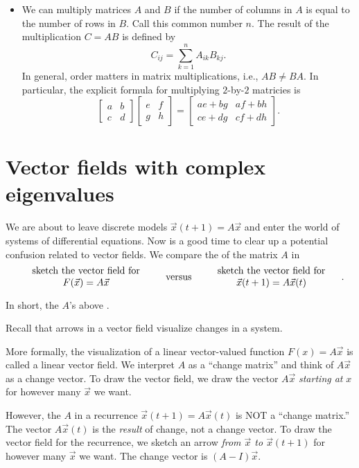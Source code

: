 \documentclass[../main.tex]{subfiles}
\begin{document}
\begin{itemize}
  \item We can multiply matrices \(A\) and \(B\) if the number of columns in \(A\) is equal to the number of rows in \(B\). Call this common number \(n\). The result of the multiplication \(C = AB\) is defined by 
\[
  C_{ij} = \sum_{k=1}^{n} A_{ik} B_{kj}.
\]
In general, order matters in matrix multiplications, i.e., \(AB \ne BA\).  In particular, the explicit formula for multiplying \(2\)-by-\(2\) matricies is
\[
  \begin{bmatrix}
    a & b \\
    c & d
  \end{bmatrix}
  \begin{bmatrix}
    e & f \\
    g & h
  \end{bmatrix}
  =
  \begin{bmatrix}
    ae + bg & af + bh \\
    ce + dg & cf + dh
  \end{bmatrix}.
\]
\end{itemize}
\clearpage

\section{Vector fields with complex eigenvalues}

We are about to leave discrete models \(\vec{x}(t+1) = A \vec{x}\) and enter the world of systems of differential equations.  Now is a good time to clear up a potential confusion related to vector fields. We compare the  of the matrix \(A\) in 
\[
  \parbox[c]{2in}{\centering sketch the vector field for \(F(\vec{x}) = A \vec{x}\)} \quad\text{versus}\quad \parbox[c]{2in}{\centering sketch the vector field for \(\vec{x}(t+1) = A \vec{x}(t)\)}.
\]
\medskip

\faExclamationTriangle{} In short, the \(A\)'s above . 

Recall that arrows in a vector field visualize changes in a system. 

More formally, the visualization of a linear vector-valued function \(F(x) = A \vec{x}\) is called a linear vector field.  We interpret \(A\) as a ``change matrix'' and think of \(A \vec{x}\) as a change vector.  To draw the vector field, we draw the vector \(A \vec{x}\) \emph{starting at} \(x\) for however many \(\vec{x}\) we want.

However, the \(A\) in a recurrence \(\vec{x}(t+1) = A \vec{x}(t)\) is NOT a ``change matrix.'' The vector \(A \vec{x}(t)\) is the \emph{result} of change, not a change vector. To draw the vector field for the recurrence, we sketch an arrow \emph{from \(\vec{x}\) to \(\vec{x}(t+1)\)} for however many \(\vec{x}\) we want. The change vector is \((A - I) \vec{x}\).
\end{document}
